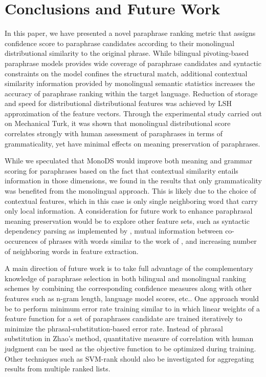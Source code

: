 \documentclass[11pt]{article}
\begin{document}
{{\section{Conclusions and Future Work}
In this paper, we have presented a novel paraphrase ranking metric that assigns confidence score to paraphrase candidates according to their monolingual distributional similarity to the original phrase. While bilingual pivoting-based paraphrase models provides wide coverage of paraphrase candidates and syntactic constraints on the model confines the structural match, additional contextual similarity information provided by monolingual semantic statistics increases the accuracy of paraphrase ranking within the target language. Reduction of storage and speed for distributional distributional features was achieved by LSH approximation of the feature vectors. Through the experimental study carried out on Mechanical Turk, it was shown that monolingual distributional score correlates strongly with human assessment of paraphrases in terms of grammaticality, yet have minimal effects on meaning preservation of paraphrases.

While we speculated that MonoDS would improve both meaning and grammar scoring for paraphrases based on the fact that contextual similarity entails information in those dimensions, we found in the results that only grammaticality was benefited from the monolingual approach. This is likely due to the choice of contextual features, which in this case is only single neighboring word that carry only local information. A consideration for future work to enhance paraphrasal meaning preservation would be to explore other feature sets, such as syntactic dependency parsing as implemented by , mutual information between co-occurences of phrases with words similar to the work of , and increasing number of neighboring words in feature extraction.

A main direction of future work is to take full advantage of the complementary knowledge of paraphrase selection in both bilingual and monolingual ranking schemes by combining the corresponding confidence measures along with other features such as n-gram length, language model scores, etc.. One approach would be to perform minimum error rate training similar to  in which linear weights of a feature function for a set of paraphrases candidate are trained iteratively to minimize the phrasal-substitution-based error rate. Instead of phrasal substitution in Zhao's method, quantitative measure of correlation with human judgment can be used as the objective function to be optimized during training. Other techniques such as SVM-rank \cite{Joachims02} should also be investigated for aggregating results from multiple ranked lists. 

}}
\end{document}
